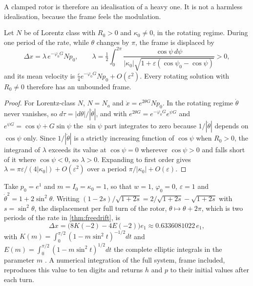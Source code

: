 A clamped rotor is therefore an idealisation of a heavy one. It is not a harmless idealisation, because the frame feels the modulation.

\begin{theorem}
\label{thm:freedrift}
Let $N$ be of Lorentz class with $R_0>0$ and $\kappa_0\neq0$, in the rotating regime. During one period of the rate, while $\theta$ changes by $\pi$,
the frame is displaced by
\[
\Delta x=\lambda\,e^{-\varphi_0G}Np_0,\qquad \lambda=\tfrac12\int_0^{2\pi}\frac{\cos\psi\,d\psi}{|\kappa_0|\sqrt{1+\varepsilon(\cos\psi_0-\cos\psi)}}>0,
\]
and its mean velocity is $\tfrac\varepsilon4e^{-\varphi_0G}Np_0+O(\varepsilon^2)$. Every rotating solution with $R_0\neq0$ therefore has an unbounded frame.
\end{theorem}

\begin{proof}
For Lorentz-class $N$, $N=N_a$ and $\dot x=e^{2\theta G}Np_0$. In the rotating regime $\dot\theta$ never vanishes, so $d\tau=|d\theta|/|\dot\theta|$, and
with $e^{2\theta G}=e^{-\varphi_0G}e^{\psi G}$ and $e^{\psi G}=\cos\psi+G\sin\psi$ the $\sin\psi$ part integrates to zero because $1/|\dot\theta|$ depends on
$\cos\psi$ only. Since $1/|\dot\theta|$ is a strictly increasing function of $\cos\psi$ when $R_0>0$, the integrand of $\lambda$ exceeds its value at
$\cos\psi=0$ wherever $\cos\psi>0$ and falls short of it where $\cos\psi<0$, so $\lambda>0$. Expanding to first order gives
$\lambda=\pi\varepsilon/(4|\kappa_0|)+O(\varepsilon^2)$ over a period $\pi/|\kappa_0|+O(\varepsilon)$.
\end{proof}

\begin{example}
\label{ex:drift}
Take $p_0=e^1$ and $m=I_0=\kappa_0=1$, so that $w=1$, $\varphi_0=0$, $\varepsilon=1$ and $\dot\theta^2=1+2\sin^2\theta$. Writing
$(1-2s)/\sqrt{1+2s}=2/\sqrt{1+2s}-\sqrt{1+2s}$ with $s=\sin^2\theta$, the displacement per full turn of the rotor, $\theta\mapsto\theta+2\pi$, which is two periods of the rate in
\cref{thm:freedrift}, is
\[
\Delta x=\bigl(8K(-2)-4E(-2)\bigr)e_1\approx0.6336081022\,e_1 ,
\]
with $K(m)=\int_0^{\pi/2}(1-m\sin^2t)^{-1/2}dt$ and $E(m)=\int_0^{\pi/2}(1-m\sin^2t)^{1/2}dt$ the complete elliptic integrals in the parameter $m$
\cite{DLMF}. A numerical integration of the full system, frame included, reproduces this value to ten digits and returns $h$ and $p$ to their
initial values after each turn.
\end{example}

